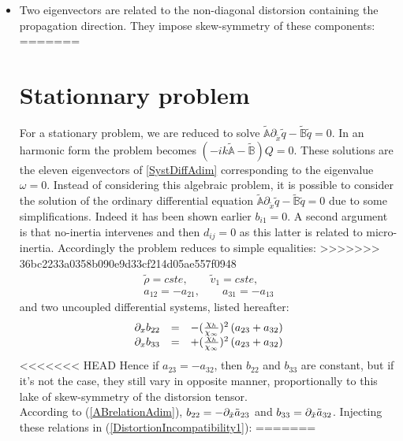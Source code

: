 \documentclass[
10pt, %
a4paper, %
oneside, %
headinclude,footinclude, %
table
]{scrartcl}
\begin{document}
\begin{itemize}
\item Two eigenvectors are related to the non-diagonal distorsion containing the propagation direction. They impose skew-symmetry of these components:
=======
\section{Stationnary problem}
For a stationary problem, we are reduced to solve $\tilde{\mathbb{A}}\partial_{\tilde{x}}\tilde{q}-\tilde{\mathbb{B}}\tilde{q}=0$. In an harmonic form the problem becomes $(-ik\tilde{\mathbb{A}}-\tilde{\mathbb{B}})Q=0$. These solutions are the eleven eigenvectors of \ref{SystDiffAdim} corresponding  to the eigenvalue $\omega=0$. Instead of considering this algebraic problem, it is possible to consider the solution of the ordinary differential equation $\tilde{\mathbb{A}}\partial_{\tilde{x}}\tilde{q}-\tilde{\mathbb{B}}\tilde{q}=0$ due to some simplifications. Indeed it has been shown earlier $b_{i1}=0$. A second argument is that no-inertia intervenes and then $d_{ij}=0$ as this latter is related to micro-inertia. Accordingly the problem reduces to simple equalities:
>>>>>>> 36bc2233a0358b090e9d33cf214d05ae557f0948
$$
\begin{array}{c}
\tilde{\rho}=\textit{cste}, \quad\quad	\tilde{v}_{1}=\textit{cste},
\\
a_{12}=-a_{21}, \quad\quad
a_{31}=-a_{13}
\end{array}
$$
and two uncoupled differential systems, listed hereafter:
\begin{equation}\label{DistortionIncompatibility1}
\begin{array}{rcl}
\partial_{x}b_{22}&=&-(\frac{\chi_{h}}{\chi_{\infty}})^2\left(a_{23}+a_{32}\right)\\
\partial_{x}b_{33}&=&+(\frac{\chi_{h}}{\chi_{\infty}})^2\left(a_{23}+a_{32}\right)
\end{array}
\end{equation}
<<<<<<< HEAD
Hence if $a_{23}=-a_{32}$, then $b_{22}$ and $b_{33}$ are constant, but if it's not the case, they still vary in opposite manner, proportionally to this lake of skew-symmetry of the distorsion tensor. \\
According to (\ref{ABrelationAdim}), $b_{22}=-\partial_{\tilde{x}}\tilde{a}_{23}$ and 
$b_{33}=\partial_{\tilde{x}}\tilde{a}_{32}$. Injecting these relations in 
(\ref{DistortionIncompatibility1}):
=======
\begin{equation}\label{StationnnaryMotion1}

\end{equation}
\end{itemize}
\end{document}
